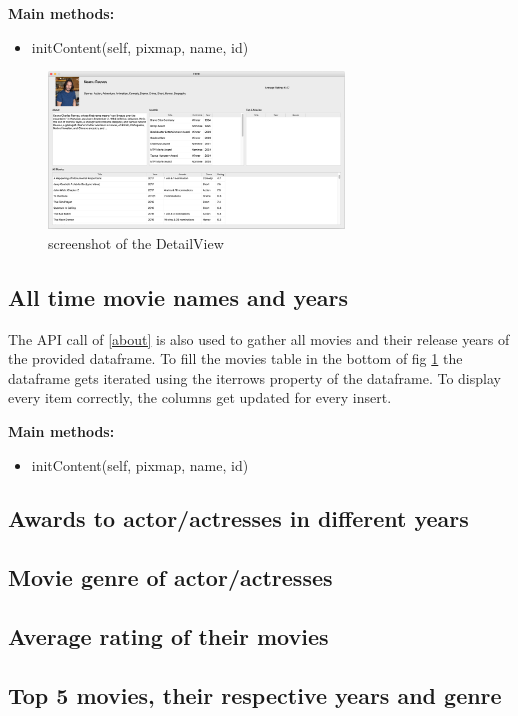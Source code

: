 \documentclass[12pt]{article}
\begin{document}
\textbf{Main methods:}
\begin{itemize}
      \item initContent(self, pixmap, name, id)
\end{itemize}

\begin{figure}[h]
      \centering
      \includegraphics[width=0.7\textwidth]{img/detail-window-screen.png}
      \caption{\label{fig:detail-window-screen} screenshot of the DetailView}
\end{figure}

\subsection{All time movie names and years} \label{movies}
The API call of \ref{about} is also used to gather all movies and their release years of
the provided dataframe. To fill the movies table in the bottom of fig \ref{fig:detail-window-screen} the dataframe gets iterated using the iterrows property of the
dataframe. To display every item correctly, the columns get updated for every insert.

\textbf{Main methods:}
\begin{itemize}
      \item initContent(self, pixmap, name, id)
\end{itemize}

\subsection{Awards to actor/actresses in different years} \label{awards}

\subsection{Movie genre of actor/actresses} \label{genre}

\subsection{Average rating of their movies} \label{average-rating}

\subsection{Top 5 movies, their respective years and genre} \label{top-movies}
\end{document}
